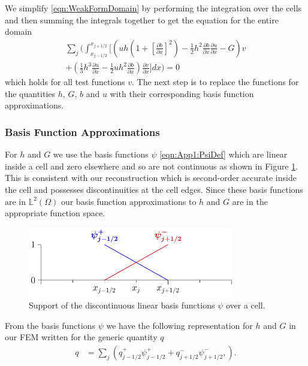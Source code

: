We simplify \eqref{eqn:WeakFormDomain} by performing the integration over the cells and then summing the integrals together to get the equation for the entire domain
\begin{multline}
\label{eq:elementwiseint}
 \sum_{j} \Bigg(  \int_{x_{j-1/2} }^{{x_{j+1/2}}} \Bigg[  \left( uh \left(1 + \left[\frac{\partial b}{\partial x}\right]^2 \right)  - \frac{1}{2}h^2\frac{\partial b}{\partial x}  \frac{\partial u }{\partial x}  -  G \right) v   \\ +  \left(\frac{1}{3}h^3  \frac{\partial {u}}{\partial x}    -     \frac{1}{2} uh^2\frac{\partial b}{\partial x}    \right) \frac{\partial v }{\partial x} \Bigg]dx \Bigg)  = 0
\end{multline}
which holds for all test functions $v$. The next step is to replace the functions for the quantities $h$, $G$, $b$ and $u$ with their corresponding basis function approximations. 

\subsubsection{Basis Function Approximations}
For $h$ and $G$ we use the basis functions $\psi$ \eqref{eqn:App1:PsiDef} which are linear inside a cell and zero elsewhere and so are not continuous as shown in Figure \ref{fig:P1DiscBasis}. This is consistent with our reconstruction which is second-order accurate inside the cell and possesses discontinuities at the cell edges. Since these basis functions are in $\mathbb{L}^2(\Omega)$ our basis function approximations to $h$ and $G$ are in the appropriate function space.
\begin{figure}
	\centering
	\includegraphics[width=0.8\textwidth]{./chp3/figures/P1.pdf}
	\caption{Support of the discontinuous linear basis functions $\psi$ over a cell.}
	\label{fig:P1DiscBasis}
\end{figure}

From the basis functions $\psi$ we have the following representation for $h$ and $G$ in our FEM written for the generic quantity $q$
\begin{align}
\label{eqn:FEapproxtohG}
q &= \sum_j \left( q^+_{j-1/2}\psi^+_{j-1/2}  + q^-_{j+1/2}\psi^-_{j+1/2}, \right).
\end{align}

